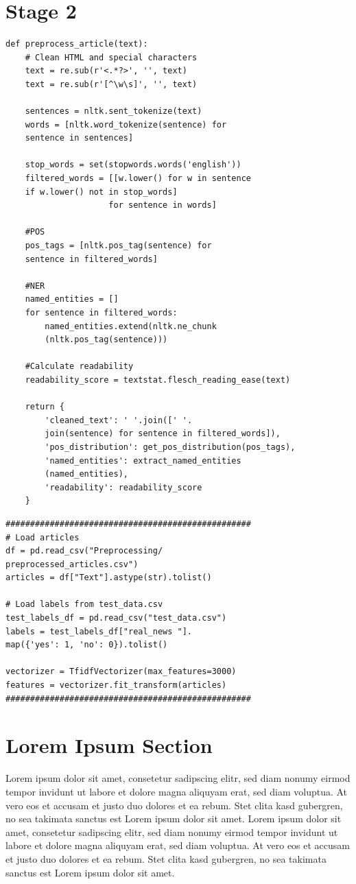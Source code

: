 \documentclass[12pt,a4paper,twocolumn]{article}
\begin{document}
\section{Stage 2}

\begingroup
    \fontsize{7pt}{8pt}\selectfont
    \begin{verbatim}  
def preprocess_article(text):
    # Clean HTML and special characters
    text = re.sub(r'<.*?>', '', text)
    text = re.sub(r'[^\w\s]', '', text)
    
    sentences = nltk.sent_tokenize(text)
    words = [nltk.word_tokenize(sentence) for 
    sentence in sentences]
    
    stop_words = set(stopwords.words('english'))
    filtered_words = [[w.lower() for w in sentence 
    if w.lower() not in stop_words] 
                     for sentence in words]
    
    #POS 
    pos_tags = [nltk.pos_tag(sentence) for 
    sentence in filtered_words]
    
    #NER
    named_entities = []
    for sentence in filtered_words:
        named_entities.extend(nltk.ne_chunk
        (nltk.pos_tag(sentence)))
    
    #Calculate readability
    readability_score = textstat.flesch_reading_ease(text)
    
    return {
        'cleaned_text': ' '.join([' '.
        join(sentence) for sentence in filtered_words]),
        'pos_distribution': get_pos_distribution(pos_tags),
        'named_entities': extract_named_entities
        (named_entities),
        'readability': readability_score
    }
    \end{verbatim}  
\endgroup


\begingroup
    \fontsize{7pt}{8pt}\selectfont
    \begin{verbatim}  
##################################################
# Load articles
df = pd.read_csv("Preprocessing/
preprocessed_articles.csv")
articles = df["Text"].astype(str).tolist()

# Load labels from test_data.csv
test_labels_df = pd.read_csv("test_data.csv")
labels = test_labels_df["real_news "].
map({'yes': 1, 'no': 0}).tolist()

vectorizer = TfidfVectorizer(max_features=3000)
features = vectorizer.fit_transform(articles)
##################################################
\end{verbatim}  
\endgroup

\section{Lorem Ipsum Section}
Lorem ipsum dolor sit amet, consetetur sadipscing elitr, sed diam nonumy eirmod tempor invidunt ut labore et dolore magna aliquyam erat, sed diam voluptua. At vero eos et accusam et justo duo dolores et ea rebum. Stet clita kasd gubergren, no sea takimata sanctus est Lorem ipsum dolor sit amet. Lorem ipsum dolor sit amet, consetetur sadipscing elitr, sed diam nonumy eirmod tempor invidunt ut labore et dolore magna aliquyam erat, sed diam voluptua. At vero eos et accusam et justo duo dolores et ea rebum. Stet clita kasd gubergren, no sea takimata sanctus est Lorem ipsum dolor sit amet.
\end{document}
